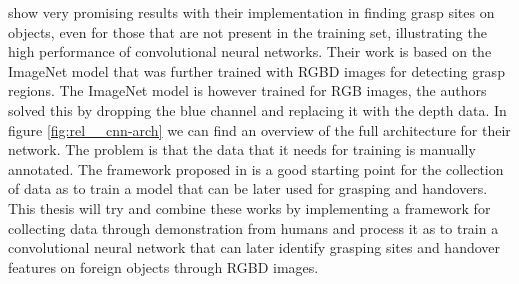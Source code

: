 \textcite{Redmon2014} show very promising results with their implementation in finding grasp sites on objects, even for those that are not present in the training set, illustrating the high performance of convolutional neural networks. Their work is based on the ImageNet model that was further trained with RGBD images for detecting grasp regions. The ImageNet model is however trained for RGB images, the authors solved this by dropping the blue channel and replacing it with the depth data. In figure \ref{fig:rel__cnn-arch} we can find an overview of the full architecture for their network. The problem is that the data that it needs for training is manually annotated. The framework proposed in \parencite{Chan2015a} is a good starting point for the collection of data as to train a model that can be later used for grasping and handovers. This thesis will try and combine these works by implementing a framework for collecting data through demonstration from humans and process it as to train a convolutional neural network that can later identify grasping sites and handover features on foreign objects through RGBD images.
